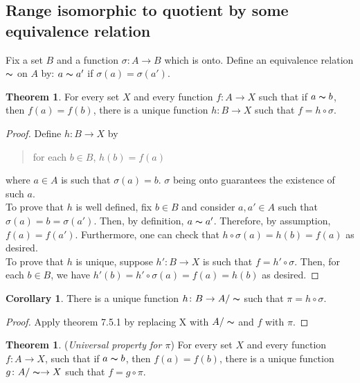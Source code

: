 \documentclass[14pt]{article}
\theoremstyle{definition}
\newtheorem{theorem}[definition]{Theorem}
\newtheorem{coro}[definition]{Corollary}
\newcommand{\eq}{\thicksim}
\newcommand{\fun}[3]{#1\colon #2\rightarrow#3}
\begin{document}
\subsection{Range isomorphic to quotient by some equivalence relation}
Fix a set $B$ and a function $\fun{\sigma}{A}{B}$ which is onto. Define an equivalence relation $\eq$
on $A$ by: $a\eq a'$ if $\sigma(a)=\sigma(a')$.

\begin{theorem}
    For every set $X$ and every function $\fun{f}{A}{X}$ such that if $a\eq b$, then $f(a)=f(b)$, there is
    a unique function $\fun{h}{B}{X}$ such that $f=h\circ \sigma$.
\end{theorem}

\begin{proof}
    Define $\fun{h}{B}{X}$ by
    \begin{quote}
       \centering for each $b\in B$,  $h(b)=f(a)$
    \end{quote}
    where $a\in A$ is such that $\sigma (a)=b$. $\sigma$ being onto guarantees the existence of such $a$.\\
    To prove that $h$ is well defined, fix $b\in B$ and consider $a, a'\in A$ such that $\sigma(a)=b=\sigma(a')$.
    Then, by definition, $a\eq a'$. Therefore, by assumption, $f(a)=f(a')$. Furthermore, one can check that
    $h\circ \sigma (a)=h(b)=f(a)$ as desired.\\
    To prove that $h$ is unique, suppose $\fun{h'}{B}{X}$ is such that $f=h'\circ \sigma$. Then, for 
    each $b\in B$, we have $h'(b)=h'\circ \sigma (a)=f(a)=h(b)$ as desired.
\end{proof}

\vspace{2mm}

\begin{coro}
There is a  unique function $\fun{h}{B}{A/\eq}$ such that $\pi=h\circ \sigma$.
\end{coro}
\begin{proof}
    Apply theorem 7.5.1 by replacing X with $A/\eq$ and $f$ with $\pi$.
\end{proof}

\vspace{2mm}

\begin{theorem}
    (\textit{Universal property for $\pi$}) For every set $X$ and every function $\fun{f}{A}{X}$,
    such that if $a\eq b$, then $f(a)=f(b)$, there is a unique function $\fun{g}{A/\eq}{X}$
    such that $f=g\circ \pi$. 
\end{theorem}
\end{document}

